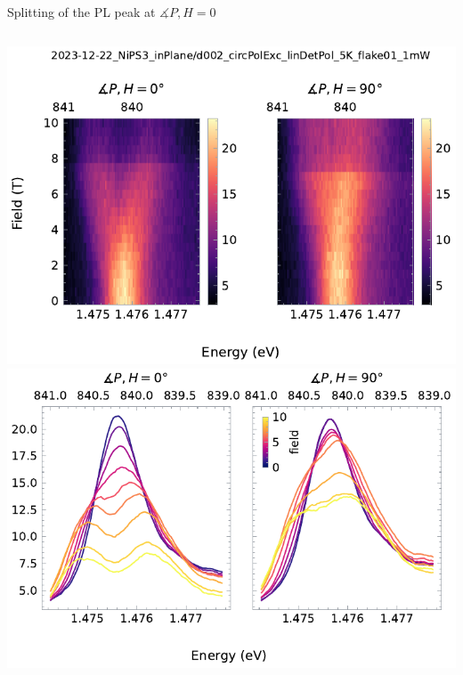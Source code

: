\begin{frame}{Splitting of the PL peak at $\measuredangle P,H=0$}
	\begin{columns}
	\centering
	\includegraphics{../figures/2023-12-10 splitting.pdf}
	\centering
	\includegraphics{../figures/2023-12-10 splitting quantified.pdf}
	\end{columns}
\end{frame}


